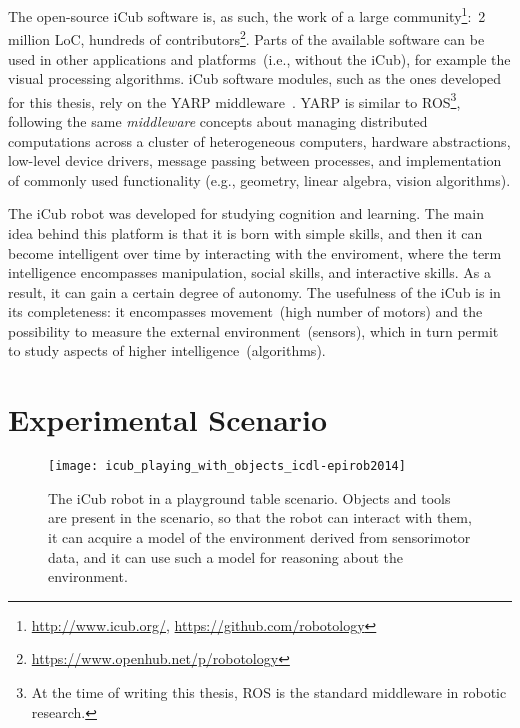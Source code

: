 The open-source iCub software is, as such, the work of a large community\footnote{\url{http://www.icub.org/}, \url{https://github.com/robotology}}:~2 million \ac{LoC}, hundreds of contributors\footnote{\url{https://www.openhub.net/p/robotology}}.
Parts of the available software can be used in other applications and platforms~(i.e., without the iCub), for example the visual processing algorithms.
iCub software modules, such as the ones developed for this thesis, rely on the \ac{YARP} middleware~\cite{metta:2006:yarp,fitzpatrick:2014:yarp}.
\ac{YARP} is similar to \ac{ROS}\footnote{%
At the time of writing this thesis, \ac{ROS} \cite{quigley:2009:ros} is the  standard middleware in robotic research.
}, %
following the same \emph{middleware} concepts about managing distributed computations across a cluster of heterogeneous computers, hardware abstractions, low-level device drivers, message passing between processes, and implementation of commonly used functionality (e.g., geometry, linear algebra, vision algorithms).

The iCub robot was developed for studying cognition and learning.
The main idea behind this platform is that it is born with simple skills, and then it can become intelligent over time by interacting with the enviroment, where the term intelligence encompasses manipulation, social skills, and interactive skills.
As a result, it can gain a certain degree of autonomy.
The usefulness of the iCub is in its completeness: it encompasses movement~(high number of motors) and the possibility to measure the external environment~(sensors), which in turn permit to study aspects of higher intelligence~(algorithms).

\section{Experimental Scenario}
\label{sec:platform:scenario}

\begin{figure}
\centering
\texttt{[image: icub\_playing\_with\_objects\_icdl-epirob2014]}
\caption[The iCub robot in a playground table scenario.]{The iCub robot in a playground table scenario. Objects and tools are present in the scenario, so that the robot can interact with them, it can acquire a model of the environment derived from sensorimotor data, and it can use such a model for reasoning about the environment.}
\label{fig:icub_playing_with_objects}
\end{figure}

